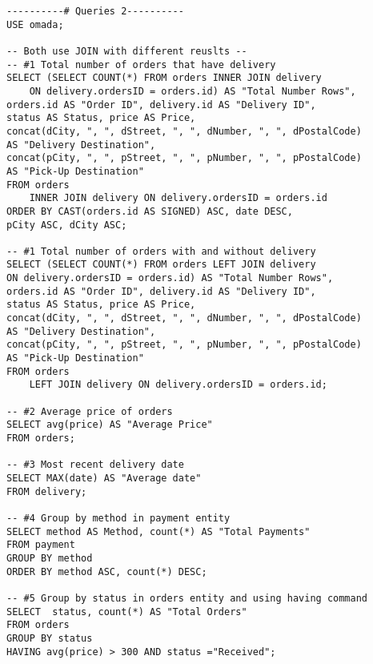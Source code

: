 \begin{lstlisting}
----------# Queries 2----------
USE omada;

-- Both use JOIN with different reuslts --
-- #1 Total number of orders that have delivery
SELECT (SELECT COUNT(*) FROM orders INNER JOIN delivery 
    ON delivery.ordersID = orders.id) AS "Total Number Rows",
orders.id AS "Order ID", delivery.id AS "Delivery ID",
status AS Status, price AS Price, 
concat(dCity, ", ", dStreet, ", ", dNumber, ", ", dPostalCode) 
AS "Delivery Destination",
concat(pCity, ", ", pStreet, ", ", pNumber, ", ", pPostalCode) 
AS "Pick-Up Destination"
FROM orders
	INNER JOIN delivery ON delivery.ordersID = orders.id
ORDER BY CAST(orders.id AS SIGNED) ASC, date DESC, 
pCity ASC, dCity ASC;

-- #1 Total number of orders with and without delivery
SELECT (SELECT COUNT(*) FROM orders LEFT JOIN delivery 
ON delivery.ordersID = orders.id) AS "Total Number Rows",
orders.id AS "Order ID", delivery.id AS "Delivery ID", 
status AS Status, price AS Price, 
concat(dCity, ", ", dStreet, ", ", dNumber, ", ", dPostalCode) 
AS "Delivery Destination",
concat(pCity, ", ", pStreet, ", ", pNumber, ", ", pPostalCode) 
AS "Pick-Up Destination"
FROM orders
	LEFT JOIN delivery ON delivery.ordersID = orders.id;
    
-- #2 Average price of orders
SELECT avg(price) AS "Average Price"
FROM orders;

-- #3 Most recent delivery date 
SELECT MAX(date) AS "Average date"
FROM delivery;

-- #4 Group by method in payment entity
SELECT method AS Method, count(*) AS "Total Payments"
FROM payment
GROUP BY method
ORDER BY method ASC, count(*) DESC;

-- #5 Group by status in orders entity and using having command
SELECT  status, count(*) AS "Total Orders"
FROM orders
GROUP BY status
HAVING avg(price) > 300 AND status ="Received";
\end{lstlisting}

